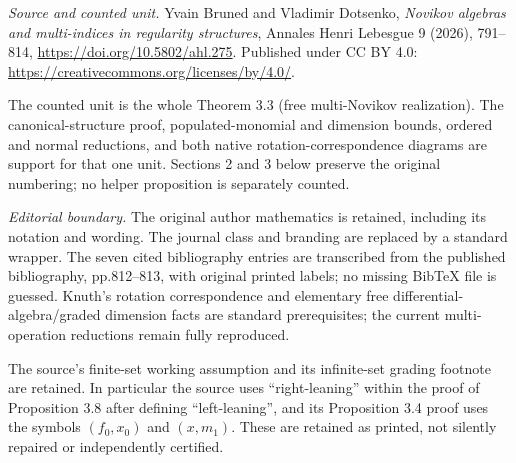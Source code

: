 \noindent\textit{Source and counted unit.} Yvain Bruned and Vladimir Dotsenko, \emph{Novikov algebras and multi-indices in regularity structures}, Annales Henri Lebesgue 9 (2026), 791--814, \url{https://doi.org/10.5802/ahl.275}. Published under CC BY 4.0: \url{https://creativecommons.org/licenses/by/4.0/}.
\par\noindent The counted unit is the whole Theorem 3.3 (free multi-Novikov realization). The canonical-structure proof, populated-monomial and dimension bounds, ordered and normal reductions, and both native rotation-correspondence diagrams are support for that one unit. Sections 2 and 3 below preserve the original numbering; no helper proposition is separately counted.
\par\noindent\textit{Editorial boundary.} The original author mathematics is retained, including its notation and wording. The journal class and branding are replaced by a standard wrapper. The seven cited bibliography entries are transcribed from the published bibliography, pp.812--813, with original printed labels; no missing BibTeX file is guessed. Knuth's rotation correspondence and elementary free differential-algebra/graded dimension facts are standard prerequisites; the current multi-operation reductions remain fully reproduced.
\par\noindent The source's finite-set working assumption and its infinite-set grading footnote are retained. In particular the source uses ``right-leaning'' within the proof of Proposition 3.8 after defining ``left-leaning'', and its Proposition 3.4 proof uses the symbols $(f_0,x_0)$ and $(x,m_1)$. These are retained as printed, not silently repaired or independently certified.
